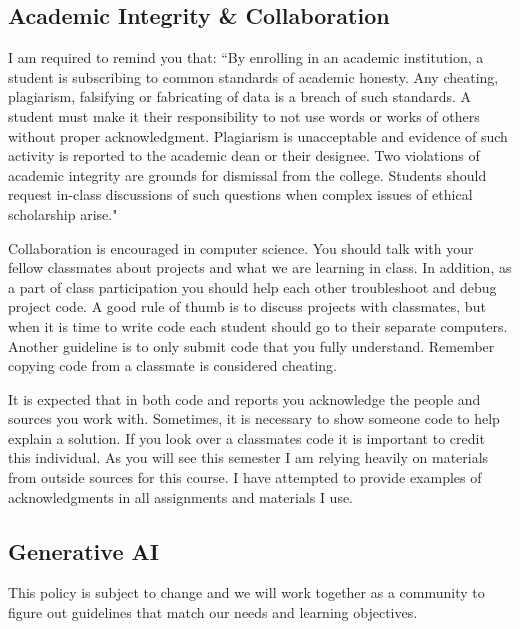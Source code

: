 \documentclass[12pt]{article}
\begin{document}
\subsection{Academic Integrity \& Collaboration}
I am required to remind you that: ``By enrolling in an academic institution, a student is subscribing to common standards of academic honesty.
Any cheating, plagiarism, falsifying or fabricating of data is a breach of such standards.
A student must make it their responsibility to not use words or works of others without proper acknowledgment.
Plagiarism is unacceptable and evidence of such activity is reported to the academic dean or their designee.
Two violations of academic integrity are grounds for dismissal from the college.
Students should request in-class discussions of such questions when complex issues of ethical scholarship arise."

Collaboration is encouraged in computer science.
You should talk with your fellow classmates about projects and what we are learning in class.
In addition, as a part of class participation you should help each other troubleshoot and debug project code. 
A good rule of thumb is to discuss projects with classmates, but when it is time to write code each student should go to their separate computers.
Another guideline is to only submit code that you fully understand. 
Remember copying code from a classmate is considered cheating.

It is expected that in both code and reports you acknowledge the people and sources you work with.
Sometimes, it is necessary to show someone code to help explain a solution.
If you look over a classmates code it is important to credit this individual.
As you will see this semester I am relying heavily on materials from outside sources for this course. 
I have attempted to provide examples of acknowledgments in all assignments and materials I use.

\subsection{Generative AI}
This policy is subject to change and we will work together as a community to figure out guidelines that match our needs and learning objectives.
\end{document}
